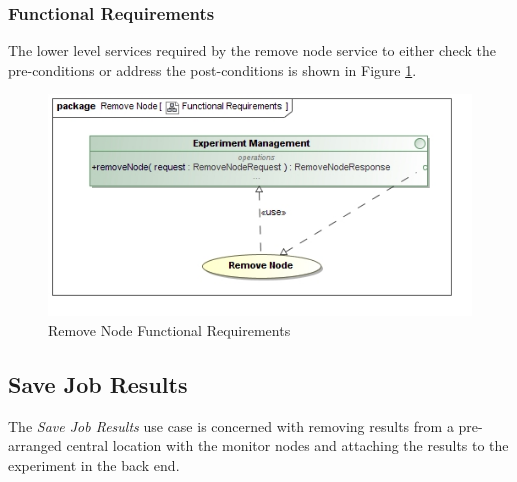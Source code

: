 \subsubsection {Functional Requirements}
The lower level services required by the remove node service to 
either check the pre-conditions or address the post-conditions is shown in
Figure \ref{fig:removeNodeFunctionalRequirements}.
\begin{figure}[H]
  \begin{center}
  \includegraphics[scale=0.38]{../Diagrams and Charts/Experiment/Remove Node Functional Requirements.jpg}
  \caption{Remove Node Functional Requirements}
  \label{fig:removeNodeFunctionalRequirements}
  \end{center}
\end{figure}



\subsection {Save Job Results}
The \textit{Save Job Results} use case is concerned with removing results from a
pre-arranged central location with the monitor nodes and attaching the results
to the experiment in the back end.

